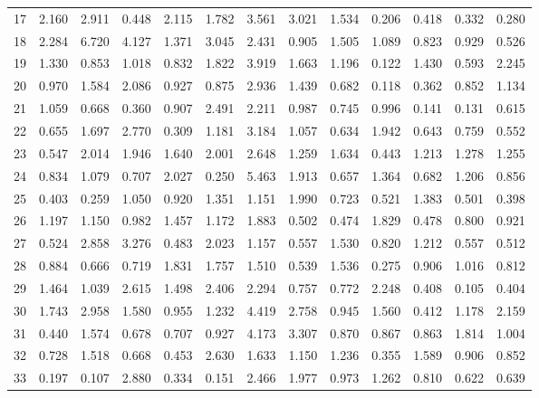 \begin{tabular}{lrrrrrrrrrrrr}
17  &  2.160 &  2.911 &  0.448 &  2.115 &  1.782 &  3.561 &  3.021 &  1.534 &  0.206 &  0.418 &  0.332 &  0.280 \\
18  &  2.284 &  6.720 &  4.127 &  1.371 &  3.045 &  2.431 &  0.905 &  1.505 &  1.089 &  0.823 &  0.929 &  0.526 \\
19  &  1.330 &  0.853 &  1.018 &  0.832 &  1.822 &  3.919 &  1.663 &  1.196 &  0.122 &  1.430 &  0.593 &  2.245 \\
20  &  0.970 &  1.584 &  2.086 &  0.927 &  0.875 &  2.936 &  1.439 &  0.682 &  0.118 &  0.362 &  0.852 &  1.134 \\
21  &  1.059 &  0.668 &  0.360 &  0.907 &  2.491 &  2.211 &  0.987 &  0.745 &  0.996 &  0.141 &  0.131 &  0.615 \\
22  &  0.655 &  1.697 &  2.770 &  0.309 &  1.181 &  3.184 &  1.057 &  0.634 &  1.942 &  0.643 &  0.759 &  0.552 \\
23  &  0.547 &  2.014 &  1.946 &  1.640 &  2.001 &  2.648 &  1.259 &  1.634 &  0.443 &  1.213 &  1.278 &  1.255 \\
24  &  0.834 &  1.079 &  0.707 &  2.027 &  0.250 &  5.463 &  1.913 &  0.657 &  1.364 &  0.682 &  1.206 &  0.856 \\
25  &  0.403 &  0.259 &  1.050 &  0.920 &  1.351 &  1.151 &  1.990 &  0.723 &  0.521 &  1.383 &  0.501 &  0.398 \\
26  &  1.197 &  1.150 &  0.982 &  1.457 &  1.172 &  1.883 &  0.502 &  0.474 &  1.829 &  0.478 &  0.800 &  0.921 \\
27  &  0.524 &  2.858 &  3.276 &  0.483 &  2.023 &  1.157 &  0.557 &  1.530 &  0.820 &  1.212 &  0.557 &  0.512 \\
28  &  0.884 &  0.666 &  0.719 &  1.831 &  1.757 &  1.510 &  0.539 &  1.536 &  0.275 &  0.906 &  1.016 &  0.812 \\
29  &  1.464 &  1.039 &  2.615 &  1.498 &  2.406 &  2.294 &  0.757 &  0.772 &  2.248 &  0.408 &  0.105 &  0.404 \\
30  &  1.743 &  2.958 &  1.580 &  0.955 &  1.232 &  4.419 &  2.758 &  0.945 &  1.560 &  0.412 &  1.178 &  2.159 \\
31  &  0.440 &  1.574 &  0.678 &  0.707 &  0.927 &  4.173 &  3.307 &  0.870 &  0.867 &  0.863 &  1.814 &  1.004 \\
32  &  0.728 &  1.518 &  0.668 &  0.453 &  2.630 &  1.633 &  1.150 &  1.236 &  0.355 &  1.589 &  0.906 &  0.852 \\
33  &  0.197 &  0.107 &  2.880 &  0.334 &  0.151 &  2.466 &  1.977 &  0.973 &  1.262 &  0.810 &  0.622 &  0.639 \\

\end{tabular}
